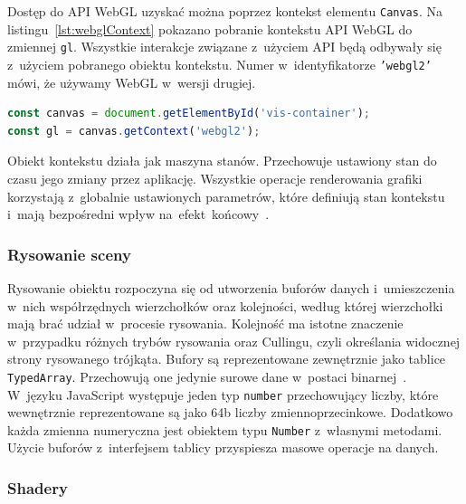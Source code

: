 Dostęp do API WebGL uzyskać można poprzez kontekst elementu \texttt{Canvas}. Na listingu~\ref{lst:webglContext} pokazano pobranie kontekstu API WebGL do zmiennej \texttt{gl}. Wszystkie interakcje związane z~użyciem API będą odbywały się z~użyciem pobranego obiektu kontekstu. Numer w~identyfikatorze \texttt{’webgl2’} mówi, że używamy WebGL w~wersji drugiej.

\begin{lstlisting}[language=javascript, label={lst:webglContext}, caption={Pobranie kontekstu API WebGL do zmiennej}]
const canvas = document.getElementById('vis-container');
const gl = canvas.getContext('webgl2');
\end{lstlisting}
\clearpage
\begin{samepage}
Obiekt kontekstu działa jak maszyna stanów. Przechowuje ustawiony stan do czasu jego zmiany przez aplikację. Wszystkie operacje renderowania grafiki korzystają z~globalnie ustawionych parametrów, które definiują stan kontekstu i~mają bezpośredni wpływ \mbox{na efekt końcowy~\cite[Rozdział 1]{RealTime3DGraphics}.}
\end{samepage}

\subsubsection{Rysowanie sceny}
\label{sec:render}
Rysowanie obiektu rozpoczyna się od utworzenia buforów danych i~umieszczenia w~nich współrzędnych wierzchołków oraz kolejności, według której wierzchołki mają brać udział w~procesie rysowania. Kolejność ma istotne znaczenie w~przypadku różnych trybów rysowania oraz Cullingu, czyli określania widocznej strony rysowanego trójkąta. Bufory są reprezentowane zewnętrznie jako tablice \texttt{TypedArray}. Przechowują one jedynie surowe dane w~postaci binarnej~\cite{TypedArrays}. W~języku JavaScript występuje jeden typ \texttt{number} przechowujący liczby, które wewnętrznie reprezentowane są jako 64b liczby zmiennoprzecinkowe. Dodatkowo każda zmienna numeryczna jest obiektem typu \texttt{Number} z~własnymi metodami. Użycie buforów z~interfejsem tablicy przyspiesza masowe operacje na danych.

\subsubsection{Shadery}

